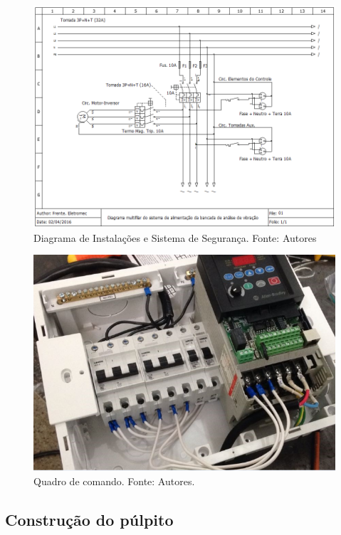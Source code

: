 \begin{figure}[H]
    \centering      \includegraphics[keepaspectratio=true,scale=0.6]{figuras/Diagrama_Instalacao.png}
    \caption{Diagrama de Instalações e Sistema de Segurança. Fonte: Autores}
    \label{Diagrama de Instalações}
\end{figure}


\begin{figure}[H]
    \centering      \includegraphics[keepaspectratio=true,scale=0.6]{figuras/protecao.png}
    \caption{Quadro de comando. Fonte: Autores.}
    \label{protecao}
\end{figure}

\subsection{Construção do púlpito}

